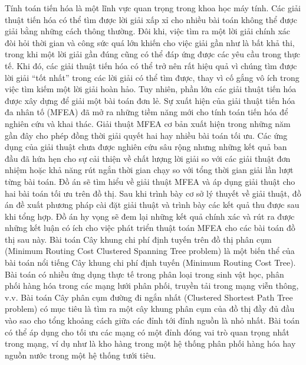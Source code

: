 Tính toán tiến hóa là một lĩnh vực quan trọng trong khoa học máy tính. Các giải thuật tiến hóa có thể tìm được lời giải xấp xỉ cho nhiều bài toán không thể được giải bằng những cách thông thường. Đôi khi, việc tìm ra một lời giải chính xác đòi hỏi thời gian và công sức quá lớn khiến cho việc giải gần như là bất khả thi, trong khi một lời giải gần đúng cũng có thể đáp ứng được các yêu cầu trong thực tế. Khi đó, các giải thuật tiến hóa có thể trở nên rất hiệu quả vì chúng tìm được lời giải “tốt nhất” trong các lời giải có thể tìm được, thay vì cố gắng vô ích trong việc tìm kiếm một lời giải hoàn hảo.
Tuy nhiên, phần lớn các giải thuật tiến hóa được xây dựng để giải một bài toán đơn lẻ. Sự xuất hiện của giải thuật tiến hóa đa nhân tố (MFEA) đã mở ra những tiềm năng mới cho tính toán tiến hóa để nghiên cứu và khai thác. Giải thuật MFEA cơ bản xuất hiện trong những năm gần đây cho phép đồng thời giải quyết hai hay nhiều bài toán tối ưu. Các ứng dụng của giải thuật chưa được nghiên cứu sâu rộng nhưng những kết quả ban đầu đã hứa hẹn cho sự cải thiện về chất lượng lời giải so với các giải thuật đơn nhiệm hoặc khả năng rút ngắn thời gian chạy so với tổng thời gian giải lần lượt từng bài toán. 
Đồ án sẽ tìm hiểu về giải thuật MFEA và áp dụng giải thuật cho hai bài toán tối ưu trên đồ thị. Sau khi trình bày cơ sở lý thuyết về giải thuật, đồ án đề xuất phương pháp cài đặt giải thuật và trình bày các kết quả thu được sau khi tổng hợp. Đồ án hy vọng sẽ đem lại những kết quả chính xác và rút ra được những kết luận có ích cho việc phát triển thuật toán MFEA cho các bài toán đồ thị sau này.
Bài toán Cây khung chi phí định tuyến trên đồ thị phân cụm (Minimum Routing Cost Clustered Spanning Tree problem) là một biến thể của bài toán nổi tiếng Cây khung chi phí định tuyến (Minimum Routing Cost Tree). Bài toán có nhiều ứng dụng thực tế trong phân loại trong sinh vật học, phân phối hàng hóa trong các mạng lưới phân phối, truyền tải trong mạng viễn thông, v.v.
Bài toán Cây phân cụm đường đi ngắn nhất (Clustered Shortest Path Tree problem) có mục tiêu là tìm ra một cây khung phân cụm của đồ thị đầy đủ đầu vào sao cho tổng khoảng cách giữa các đỉnh tới đỉnh nguồn là nhỏ nhất. Bài toán có thể áp dụng cho tối ưu các mạng có một đỉnh đóng vai trò quan trọng nhất trong mạng, ví dụ như là kho hàng trong một hệ thống phân phối hàng hóa hay nguồn nước trong một hệ thống tưới tiêu.
